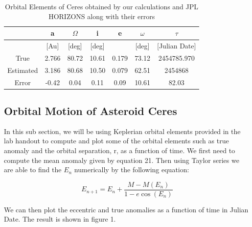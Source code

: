 \documentclass[letterpaper,12pt]{article}
\begin{document}
\FloatBarrier
\begin{table}[h!]
\caption{Orbital Elements of Ceres obtained by our calculations and JPL HORIZONS along with their errors} %
\centering %
\begin{tabular}{| c | c | c | c | c | c | c |} %
\hline %
 & a & \begin{math} \Omega \end{math}  & i & e & \begin{math} \omega \end{math}  & \begin{math} \tau \end{math} \\ [0.5ex] %
\hline %
  & [Au]  &  [deg] &[deg] & & [deg] & [Julian Date] \\ \hline 
True & 2.766 &  80.72 &   10.61 & 0.179 & 73.12 &2454785.970\\ \hline
Estimated &3.186 &  80.68 & 10.50 &  0.079 & 62.51 & 2454868\\  \hline
Error & -0.42 &  0.04 &    0.11 &   0.09 & 10.61 & 82.03\\[1ex] %
\hline %
\end{tabular}
\label{table:nonlin} %
\end{table}
\FloatBarrier

\subsection{Orbital Motion of Asteroid Ceres}
In this sub section, we will be using Keplerian orbital elements provided in the lab handout to compute and plot some of the orbital elements such as true anomaly and the orbital separation, r, as a function of time. 
We first need to compute the mean anomaly given by equation 21. Then using Taylor series we are able to find the \begin{math} E_{n} \end{math} numerically by the following equation:

\begin{equation}
E_{n+1}=E_{n}+\frac{M-M(E_{n})}{1-e\cos(E_{n})}
\end{equation}


We can then plot the eccentric and true anomalies as a function of time in Julian Date. The result is shown in figure 1.
\end{document}
